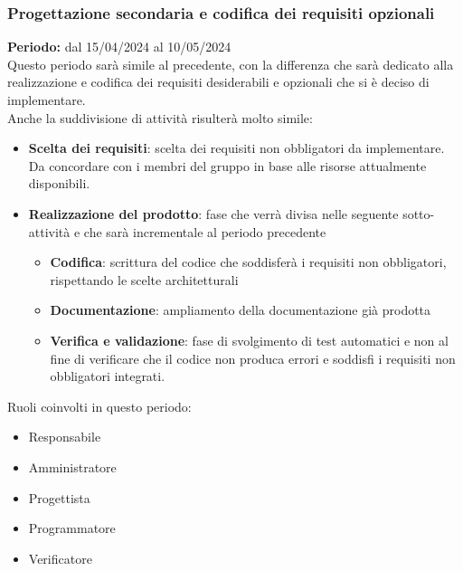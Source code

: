 \documentclass[5pt]{article}
\begin{document}
    \subsubsection{Progettazione secondaria e codifica dei requisiti opzionali}
      \textbf{Periodo:} dal 15/04/2024 al 10/05/2024 
      \vspace{0.3cm} \\
      Questo periodo sarà simile al precedente, con la differenza che sarà dedicato alla realizzazione e codifica dei requisiti desiderabili e opzionali 
      che si è deciso di implementare. \\
      Anche la suddivisione di attività risulterà molto simile:
      \begin{itemize}
        \item \textbf{Scelta dei requisiti}: scelta dei requisiti non obbligatori da implementare. Da concordare con i membri del gruppo in base alle risorse attualmente disponibili.
        \item \textbf{Realizzazione del prodotto}: fase che verrà divisa nelle seguente sotto-attività e che sarà incrementale al periodo precedente
        \begin{itemize}
          \item \textbf{Codifica}: scrittura del codice che soddisferà i requisiti non obbligatori, rispettando le scelte architetturali
          \item \textbf{Documentazione}: ampliamento della documentazione già prodotta
          \item \textbf{Verifica e validazione}: fase di svolgimento di test automatici e non al fine di verificare che il codice non produca errori e soddisfi i requisiti non obbligatori integrati.
        \end{itemize}  
      \end{itemize}
      Ruoli coinvolti in questo periodo:
      \begin{itemize}
          \item Responsabile
          \item Amministratore
          \item Progettista
          \item Programmatore
          \item Verificatore
      \end{itemize}
    
\end{document}
